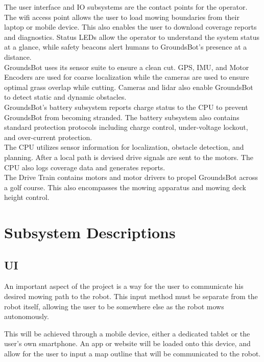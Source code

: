 \documentclass{article}
\begin{document}
  The user interface and IO subsystems are the contact points for the operator.  The wifi access point allows the user to load mowing boundaries from their laptop or mobile device.  This also enables the user to download coverage reports and diagnostics.  Status LEDs allow the operator to understand the system status at a glance, while safety beacons alert humans to GroundsBot's presence at a distance. \\

  GroundsBot uses its sensor suite to ensure a clean cut. GPS, IMU, and Motor Encoders are used for coarse localization while the cameras are used to ensure optimal grass overlap while cutting.  Cameras and lidar also enable GroundsBot to detect static and dynamic obstacles.\\

  GroundsBot's battery subsystem reports charge status to the CPU to prevent GroundsBot from becoming stranded. The battery subsystem also contains standard protection protocols including charge control, under-voltage lockout, and over-current protection. \\

  The CPU utilizes sensor information for localization, obstacle detection, and planning.  After a local path is devised drive signals are sent to the motors. The CPU also logs coverage data and generates reports.\\

  The Drive Train contains motors and motor drivers to propel GroundsBot across a golf course.  This also encompasses the mowing apparatus and mowing deck height control. \\



\section{Subsystem Descriptions}
	\subsection{UI}
	An important aspect of the project is a way for the user to communicate his desired mowing path to the robot. This input method must be separate from the robot itself, allowing the user to be somewhere else as the robot mows autonomously. 
	
	This will be achieved through a mobile device, either a dedicated tablet or the user's own smartphone. An app or website will be loaded onto this device, and allow for the user to input a map outline that will be communicated to the robot. 
	
\end{document}
